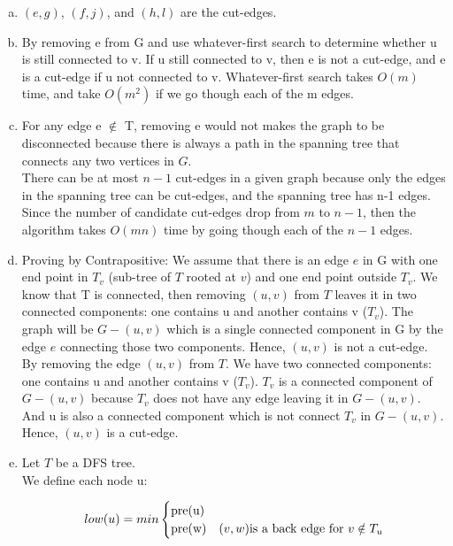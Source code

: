 \documentclass[11pt]{article}
\begin{document}
\begin{solution}
	\mbox{}
	\begin{enumerate}[(a)]
		\item $(e,g)$, $(f,j)$, and $(h,l)$ are the cut-edges.
		\item By removing e from G and use whatever-first search to determine whether u is still connected to v. If u still connected to v, then e is not a cut-edge, and e is a cut-edge if u not connected to v. Whatever-first search takes $O(m)$ time, and take $O(m^2)$ if we go though each of the m edges.
		\item For any edge e $\notin$ T, removing e would not makes the graph to be disconnected because there is always a path in the spanning tree that connects any two vertices in $G$.\\
		There can be at most $n - 1$ cut-edges in a given graph because only the edges in the spanning tree can be cut-edges, and the spanning tree has n-1 edges.\\
		Since the number of candidate cut-edges drop from $m$ to $n-1$, then the algorithm takes $O(mn)$ time by going though each of the $n-1$ edges.
		\item Proving by Contrapositive: We assume that there is an edge $e$ in G with one end point in $T_v$ (sub-tree of $T$ rooted at $v$) and one end point outside $T_v$. We know that T is connected, then removing $(u,v)$ from $T$ leaves it in two connected components: one contains u and another contains v ($T_v$). The graph will be $G-(u,v)$ which is a single connected component in G by the edge $e$ connecting those two components. Hence, $(u,v)$ is not a cut-edge.\\
		By removing the edge $(u,v)$ from $T$. We have two connected components: one contains u and another contains v ($T_v$). $T_v$ is a connected component of $G-(u,v)$ because $T_v$ does not have any edge leaving it in $G-(u,v)$. And u is also a connected component which is not connect $T_v$ in $G-(u,v)$. Hence, $(u,v)$ is a cut-edge.
		\item Let $T$ be a DFS tree.\\
		We define each node u:
		\begin{center}
			\[
			low(u) = min \begin{cases}
			$pre(u)$\\
			$pre(w)$ & \text{$(v,w)$is a back edge for $v \notin T_u$}\\
			\end{cases}
			\]
		\end{center}

\end{enumerate}
\end{solution}
\end{document}
